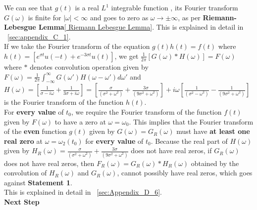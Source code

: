 \documentclass[11pt]{elsarticle}
\begin{document}


We can see that $g(t)$ is a real $L^{1}$ integrable function , its Fourier transform $G(\omega)$ is finite for $|\omega| < \infty$ and goes to zero as $\omega \to \pm \infty$, as per \textbf{Riemann-Lebesgue Lemma}[\href{https://en.wikipedia.org/wiki/Riemann-Lebesgue\_lemma}{   Riemann Lebesgue Lemma}]. This is explained in detail in ~\ref{sec:appendix_C_1}. \\

If we take the Fourier transform of the equation $g(t)  h(t) = f(t)$ where $h(t) = [ e^{\sigma t} u(-t) + e^{-3 \sigma t} u(t) ] $, we get $\frac{1}{2\pi} [ G(\omega) \ast H(\omega)] = F(\omega)$ where $\ast$ denotes convolution operation given by $F(\omega) = \frac{1}{2\pi} \int_{-\infty}^{\infty} G(\omega') H(\omega - \omega') d\omega'$ and $H(\omega)=  [ \frac{1}{  \sigma - i \omega} +  \frac{1}{  3 \sigma + i \omega}   ]  = [ \frac{\sigma}{(\sigma^{2} + \omega^{2})} + \frac{3 \sigma}{(9 \sigma^{2} + \omega^{2})} ] + i \omega [ \frac{1}{(\sigma^{2} - \omega^{2})} - \frac{1}{(9 \sigma^{2} + \omega^{2})}  ] $ is the Fourier transform of the function $h(t)$. \\


For \textbf{every value} of $t_0$, we require the Fourier transform of the function $f(t)$ given by $F(\omega)$ to have a zero at $\omega = \omega_{0}$. This implies that the Fourier transform of the \textbf{even} function $g(t) $  given by $G(\omega)=G_R(\omega)$ must have\textbf{ at least one real zero} at $\omega = \omega_{2}(t_0)$ for \textbf{every value} of $t_0$. Because the real part of $H(\omega)$ given by $H_{R}(\omega) = \frac{\sigma}{(\sigma^{2} + \omega^{2})} + \frac{3 \sigma}{(9 \sigma^{2} + \omega^{2})} $ does not have real zeros, if $G_{R}(\omega)$ does not have real zeros, then $F_{R}(\omega)= G_{R}(\omega) \ast H_{R}(\omega)$ obtained by the convolution of $H_{R}(\omega)$ and $G_{R}(\omega)$, cannot possibly have real zeros, which goes against \textbf{Statement 1}.\\

This is explained in detail in ~\ref{sec:Appendix_D_6}.\\




\textbf{Next Step}\\
\end{document}
